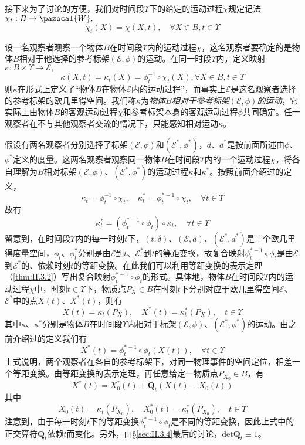 \documentclass[main.tex]{subfiles}
\begin{document}
接下来为了讨论的方便，我们对时间段$\Upsilon$下的给定的运动过程$\chi$规定记法$\chi_t:B\rightarrow\pazocal{W},$
\[\chi_t\left(X\right)=\chi\left(X,t\right),\quad\forall X\in B,t\in\Upsilon\]

设一名观察者观察一个物体$B$在时间段$\Upsilon$内的运动过程$\chi$，这名观察者要确定的是物体$B$相对于他选择的参考标架$\left(\mathcal{E},\phi\right)$的运动。在同一时段$\Upsilon$内，定义映射$\kappa:B\times\Upsilon\rightarrow\mathcal{E},$
\[\kappa\left(X,t\right)=\kappa_t\left(X\right)=\phi_t^{-1}\circ\chi_t\left(X\right),\forall X\in B, t\in\Upsilon\]
则$\kappa$在形式上定义了“物体$B$在物体$\mathcal{E}$内的运动过程”，而事实上$\mathcal{E}$是这名观察者选择的参考标架的欧几里得空间。我们称$\kappa$为\emph{物体$B$相对于参考标架$\left(\mathcal{E},\phi\right)$的运动}，它实际上由物体$B$的客观运动过程$\chi$和参考标架本身的客观运动过程$\phi$共同确定。任一观察者在不与其他观察者交流的情况下，只能感知相对运动$\kappa$。

假设有两名观察者分别选择了标架$\left(\mathcal{E},\phi\right)$和$\left(\mathcal{E}^*,\phi^*\right)$，$d$、$d^*$是按前面所述由$\phi$、$\phi^*$定义的度量。这两名观察者观察同一物体$B$在时间段$\Upsilon$内的一个运动过程$\chi$，将各自理解为$B$相对标架$\left(\mathcal{E},\phi\right)$、$\left(\mathcal{E}^*,\phi^*\right)$的运动过程$\kappa$和$\kappa^*$。按照前面介绍过的定义，
\[\kappa_t=\phi_t^{-1}\circ\chi_t,\quad\kappa_t^*=\phi_t^{*-1}\circ \chi_t,\quad\forall t\in\Upsilon\]
故有
\[\kappa_t^*=\left(\phi_t^{*-1}\circ\phi_t\right)\circ\kappa_t,\quad\forall t\in\Upsilon\]
留意到，在时间段$\Upsilon$内的每一时刻$t$下，$\left(t,\delta\right)$、$\left(\mathcal{E},d\right)$、$\left(\mathcal{E}^*,d^*\right)$是三个欧几里得度量空间，$\phi_t$、$\phi_t^*$分别是由$\mathcal{E}$到$t$、$\mathcal{E}^*$到$t$的等距变换，故复合映射$\phi_t^{*-1}\circ\phi_t$是由$\mathcal{E}$到$\mathcal{E}^*$的、依赖时刻$t$的等距变换。在此我们可以利用等距变换的表示定理（\ref{thm:II.3.2}）写出复合映射$\phi_t^{*-1}\circ\phi_t$的形式。具体地，物体$B$在时间段$\Upsilon$内的运动过程$\chi$中，时刻$t\in\Upsilon$下，物质点$P_X\in B$在时刻$t$下分别对应于欧几里得空间$\mathcal{E}$、$\mathcal{E}^*$中的点$X\left(t\right)$、$X^*\left(t\right)$，则有
\[X\left(t\right)=\kappa_t\left(P_X\right),\quad X^*\left(t\right)=\kappa_t^*\left(P_X\right),\quad t\in\Upsilon\]
其中$\kappa$、$\kappa^*$分别是物体$B$在时间段$\Upsilon$内相对于标架$\left(\mathcal{E},\phi\right)$、$\left(\mathcal{E}^*,\phi^*\right)$的运动。由之前介绍过的定义我们有
\[X^*\left(t\right)=\phi_t^{*-1}\circ\phi_t\left(X\left(t\right)\right),\quad\forall t\in\Upsilon\]
上式说明，两个观察者在各自的参考标架下，对同一物理事件的空间定位，相差一个等距变换。由等距变换的表示定理，再任意给定一物质点$P_{X_0}\in B$，有
\[X^*\left(t\right)=X_0^*\left(t\right)+\mathbf{Q}_t\left(X\left(t\right)-X_0\left(t\right)\right)\]
其中
\[X_0\left(t\right)=\kappa_t\left(P_{X_0}\right),\quad X_0^*\left(t\right)=\kappa_t^*\left(P_{X_0}\right),\quad t\in\Upsilon\]
注意到，由于每一时刻$t$下的等距变换$\phi_t^{*-1}\circ\phi_t$是不同的等距变换，因此上式中的正交算符$\mathbf{Q}_t$依赖$t$而变化。另外，由\S\ref{sec:II.3.4}最后的讨论，$\mathrm{det}\mathbf{Q}_t\equiv 1$。
\end{document}
